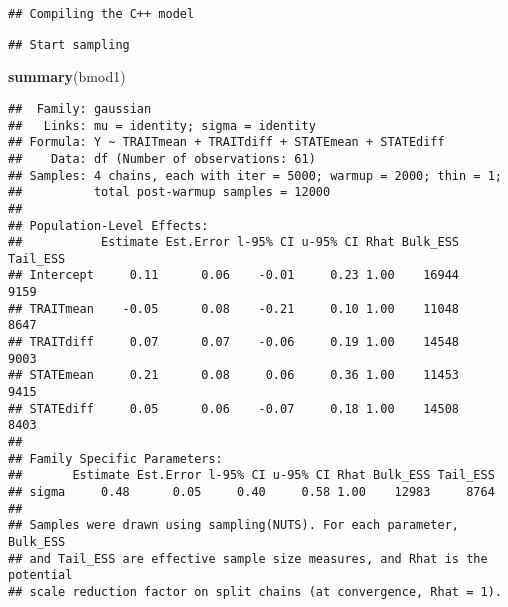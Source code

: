 \documentclass[
]{article}
\newenvironment{Shaded}{\begin{snugshade}}{\end{snugshade}}
\newcommand{\KeywordTok}[1]{\textcolor[rgb]{0.13,0.29,0.53}{\textbf{#1}}}
\newcommand{\NormalTok}[1]{#1}
\begin{document}
\begin{verbatim}
## Compiling the C++ model
\end{verbatim}

\begin{verbatim}
## Start sampling
\end{verbatim}

\begin{Shaded}
\begin{Highlighting}[]
\KeywordTok{summary}\NormalTok{(bmod1)}
\end{Highlighting}
\end{Shaded}

\begin{verbatim}
##  Family: gaussian 
##   Links: mu = identity; sigma = identity 
## Formula: Y ~ TRAITmean + TRAITdiff + STATEmean + STATEdiff 
##    Data: df (Number of observations: 61) 
## Samples: 4 chains, each with iter = 5000; warmup = 2000; thin = 1;
##          total post-warmup samples = 12000
## 
## Population-Level Effects: 
##           Estimate Est.Error l-95% CI u-95% CI Rhat Bulk_ESS Tail_ESS
## Intercept     0.11      0.06    -0.01     0.23 1.00    16944     9159
## TRAITmean    -0.05      0.08    -0.21     0.10 1.00    11048     8647
## TRAITdiff     0.07      0.07    -0.06     0.19 1.00    14548     9003
## STATEmean     0.21      0.08     0.06     0.36 1.00    11453     9415
## STATEdiff     0.05      0.06    -0.07     0.18 1.00    14508     8403
## 
## Family Specific Parameters: 
##       Estimate Est.Error l-95% CI u-95% CI Rhat Bulk_ESS Tail_ESS
## sigma     0.48      0.05     0.40     0.58 1.00    12983     8764
## 
## Samples were drawn using sampling(NUTS). For each parameter, Bulk_ESS
## and Tail_ESS are effective sample size measures, and Rhat is the potential
## scale reduction factor on split chains (at convergence, Rhat = 1).
\end{verbatim}
\end{document}
